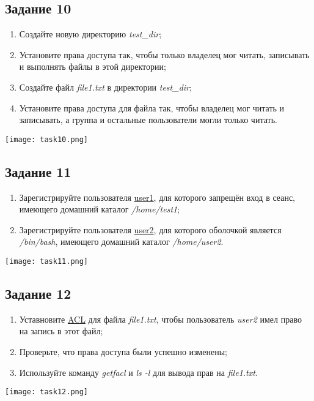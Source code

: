 \documentclass[12pt, a4paper]{report}
\begin{document}
	\subsection*{Задание 10}
	\begin{enumerate}
		\item Создайте новую директорию \textit{test\_dir};
		\item Установите права доступа так, чтобы только владелец мог читать, записывать и выполнять файлы в этой директории;
		\item Создайте файл \textit{file1.txt} в директории \textit{test\_dir};
		\item Установите права доступа для файла так, чтобы владелец мог читать и записывать, а группа и остальные пользователи могли только читать.
	\end{enumerate}
	\lstset{style=mystyle}
	
	\begin{center}
		\texttt{[image: task10.png]}
	\end{center}

	\subsection*{Задание 11}
	\begin{enumerate}
		\item Зарегистрируйте пользователя \underline{user1}, для которого запрещён вход в сеанс, имеющего домашний каталог \textit{/home/test1};
		\item Зарегистрируйте пользователя \underline{user2}, для которого оболочкой является \textit{/bin/bash}, имеющего домашний каталог \textit{/home/user2}.
	\end{enumerate}
	\lstset{style=mystyle}
	
	\begin{center}
		\texttt{[image: task11.png]}
	\end{center}

	\subsection*{Задание 12}
	\begin{enumerate}
		\item Уставновите \underline{ACL} для файла \textit{file1.txt}, чтобы пользователь \textit{user2} имел право на запись в этот файл;
		\item Проверьте, что права доступа были успешно изменены;
		\item Используйте команду \textit{getfacl} и \textit{ls -l} для вывода прав на \textit{file1.txt}.
	\end{enumerate}
	\lstset{style=mystyle}
	
	\begin{center}
		\texttt{[image: task12.png]}
	\end{center}
\end{document}
